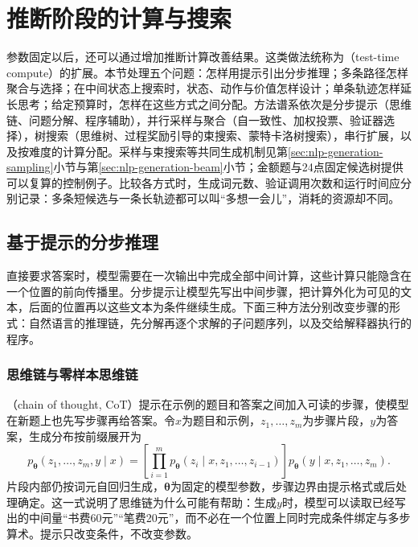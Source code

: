 \section{推断阶段的计算与搜索}
\label{sec:nlp-reasoning-test-time}

参数固定以后，还可以通过增加推断计算改善结果。这类做法统称为（test-time compute）的扩展。本节处理五个问题：怎样用提示引出分步推理；多条路径怎样聚合与选择；在中间状态上搜索时，状态、动作与价值怎样设计；单条轨迹怎样延长思考；给定预算时，怎样在这些方式之间分配。方法谱系依次是分步提示（思维链、问题分解、程序辅助），并行采样与聚合（自一致性、加权投票、验证器选择），树搜索（思维树、过程奖励引导的束搜索、蒙特卡洛树搜索），串行扩展，以及按难度的计算分配。采样与束搜索等共同生成机制见第\ref{sec:nlp-generation-sampling}小节与第\ref{sec:nlp-generation-beam}小节；金额题与24点固定候选树提供可以复算的控制例子。比较各方式时，生成词元数、验证调用次数和运行时间应分别记录：多条短候选与一条长轨迹都可以叫“多想一会儿”，消耗的资源却不同。

\subsection{基于提示的分步推理}
\label{sec:nlp-reasoning-prompting}

直接要求答案时，模型需要在一次输出中完成全部中间计算，这些计算只能隐含在一个位置的前向传播里。分步提示让模型先写出中间步骤，把计算外化为可见的文本，后面的位置再以这些文本为条件继续生成。下面三种方法分别改变步骤的形式：自然语言的推理链，先分解再逐个求解的子问题序列，以及交给解释器执行的程序。

\subsubsection{思维链与零样本思维链}
\label{sec:nlp-execution-cot}

（chain of thought, CoT）提示在示例的题目和答案之间加入可读的步骤，使模型在新题上也先写步骤再给答案。令$x$为题目和示例，$z_1,\ldots,z_m$为步骤片段，$y$为答案，生成分布按前缀展开为
\begin{equation}
  p_{\bm{\theta}}(z_1,\ldots,z_m,y\mid x)
  =\left[\prod_{i=1}^{m}p_{\bm{\theta}}(z_i\mid x,z_1,\ldots,z_{i-1})\right]
  p_{\bm{\theta}}(y\mid x,z_1,\ldots,z_m).
  \label{eq:nlp-execution-cot}
\end{equation}
片段内部仍按词元自回归生成，$\bm{\theta}$为固定的模型参数，步骤边界由提示格式或后处理确定。这一式说明了思维链为什么可能有帮助：生成$y$时，模型可以读取已经写出的中间量“书费60元”“笔费20元”，而不必在一个位置上同时完成条件绑定与多步算术。提示只改变条件，不改变参数。

